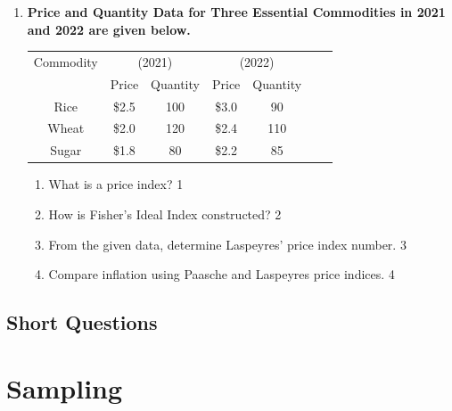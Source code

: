 \documentclass[a4paper,oneside, margin=1.4in]{book}
\begin{document}
\begin{enumerate}
  
  \begin{enumerate}
    \item
	What is an index number? \hfill 1
    \item
	How is the Marshall-Edgeworth Index formed? \hfill 2
    \item  
	From the given data, determine Paasche's quantity index number \hfill 3
    \item
	Analyze, using the cost of living index, whether price of daily necessities has increased.  \hfill 4
  \end{enumerate}

  
  \item
\textbf{Price and Quantity Data for Three Essential Commodities in 2021 and 2022 are given below.}

\begin{table}[h]
\centering
\begin{tabular}{ccccccc}
\hline
Commodity & \multicolumn{2}{c}{(2021)} & \multicolumn{2}{c}{(2022)}  \\
& Price & Quantity & Price & Quantity\\
\hline
Rice & \$2.5 & 100 & \$3.0 & 90  \\
Wheat & \$2.0 & 120 & \$2.4 & 110  \\
Sugar & \$1.8 & 80 & \$2.2 & 85 \\
\hline
\end{tabular}
\end{table}

\begin{enumerate}
    \item
    What is a price index? \hfill 1
    \item
    How is Fisher’s Ideal Index constructed? \hfill 2
    \item
    From the given data, determine Laspeyres’ price index number. \hfill 3
    \item
    Compare inflation using Paasche and Laspeyres price indices. \hfill 4
\end{enumerate}
    \end{enumerate}
\section{Short Questions}

\chapter{Sampling} 
\end{document}
